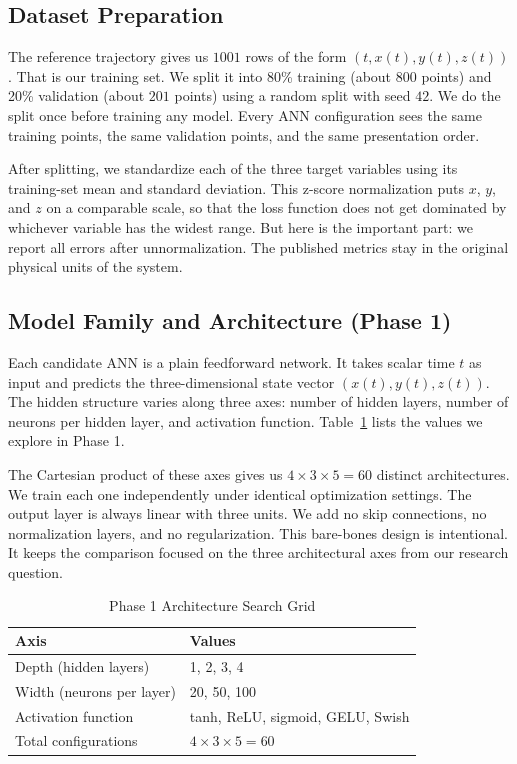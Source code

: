 \subsection{Dataset Preparation}

The reference trajectory gives us $1001$ rows of the form $(t, x(t), y(t), z(t))$. That is our training set. We split it into 80\% training (about $800$ points) and 20\% validation (about $201$ points) using a random split with seed $42$. We do the split once before training any model. Every ANN configuration sees the same training points, the same validation points, and the same presentation order.

After splitting, we standardize each of the three target variables using its training-set mean and standard deviation. This z-score normalization puts $x$, $y$, and $z$ on a comparable scale, so that the loss function does not get dominated by whichever variable has the widest range. But here is the important part: we report all errors after unnormalization. The published metrics stay in the original physical units of the system.

\subsection{Model Family and Architecture (Phase 1)}

Each candidate ANN is a plain feedforward network. It takes scalar time $t$ as input and predicts the three-dimensional state vector $(x(t), y(t), z(t))$. The hidden structure varies along three axes: number of hidden layers, number of neurons per hidden layer, and activation function. Table~\ref{tab:phase1grid} lists the values we explore in Phase 1.

The Cartesian product of these axes gives us $4 \times 3 \times 5 = 60$ distinct architectures. We train each one independently under identical optimization settings. The output layer is always linear with three units. We add no skip connections, no normalization layers, and no regularization. This bare-bones design is intentional. It keeps the comparison focused on the three architectural axes from our research question.

\begin{table}[H]
\centering
\caption{Phase 1 Architecture Search Grid}
\label{tab:phase1grid}
\renewcommand{\arraystretch}{1.2}
\begin{tabular}{|l|l|}
\hline
\textbf{Axis} & \textbf{Values} \\
\hline
Depth (hidden layers) & 1, 2, 3, 4 \\
\hline
Width (neurons per layer) & 20, 50, 100 \\
\hline
Activation function & tanh, ReLU, sigmoid, GELU, Swish \\
\hline
Total configurations & $4 \times 3 \times 5 = 60$ \\
\hline
\end{tabular}
\end{table}

